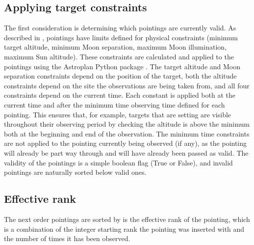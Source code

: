 \begin{colsection}
\begin{colsection}
\end{colsection}

\subsection{Applying target constraints}
\label{sec:constraints}
\begin{colsection}

The first consideration is determining which pointings are currently valid. As described in , pointings have limits defined for physical constraints (minimum target altitude, minimum Moon separation, maximum Moon illumination, maximum Sun altitude). These constraints are calculated and applied to the pointings using the Astroplan Python package \citep[\footnote{\url{https://astroplan.readthedocs.io}},][]{astroplan}. The target altitude and Moon separation constraints depend on the position of the target, both the altitude constraints depend on the site the observations are being taken from, and all four constraints depend on the current time. Each constant is applied both at the current time and after the minimum time observing time defined for each pointing. This ensures that, for example, targets that are setting are visible throughout their observing period by checking the altitude is above the minimum both at the beginning and end of the observation. The minimum time constraints are not applied to the pointing currently being observed (if any), as the pointing will already be part way through and will have already been passed as valid. The validity of the pointings is a simple boolean flag (True or False), and invalid pointings are naturally sorted below valid ones.

\end{colsection}

\subsection{Effective rank}
\label{sec:rank}
\begin{colsection}

The next order pointings are sorted by is the effective rank of the pointing, which is a combination of the integer starting rank the pointing was inserted with and the number of times it has been observed.


\end{colsection}
\end{colsection}
